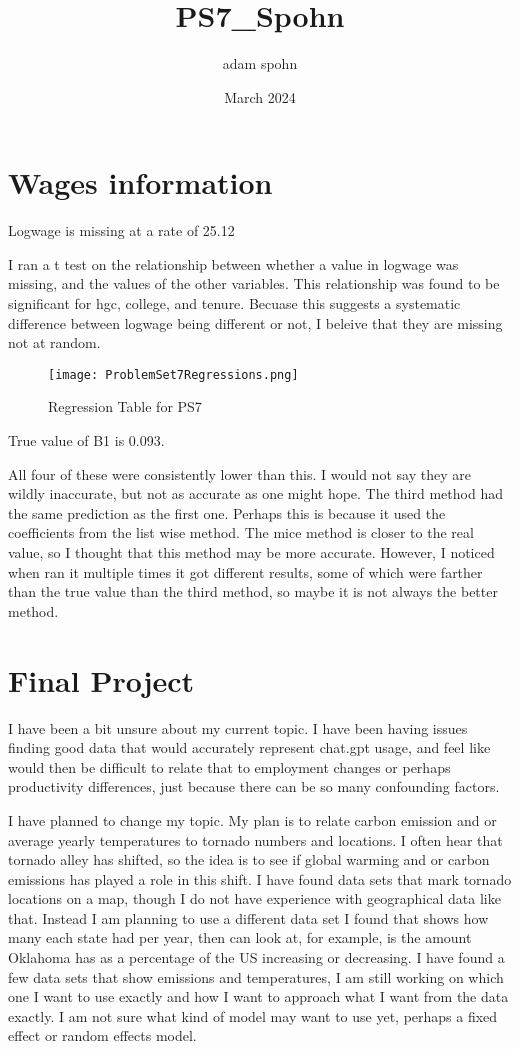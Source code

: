 \documentclass{article}
\title{PS7_Spohn}
\author{adam spohn}
\date{March 2024}
\begin{document}
\maketitle

\section{Wages information}

Logwage is missing at a rate of 25.12%

I ran a t test on the relationship between whether a value in logwage was missing, and the values of the other variables. This relationship was found to be significant for hgc, college, and tenure. Becuase this suggests a systematic difference between logwage being different or not, I beleive that they are missing not at random. 

\begin{figure}[htbp]
    \centering
    \texttt{[image: ProblemSet7Regressions.png]}
    \caption{Regression Table for PS7}
    \label{fig:problemset7}
\end{figure}

True value of B1 is 0.093.

All four of these were consistently lower than this. I would not say they are wildly inaccurate, but not as accurate as one might hope. The third method had the same prediction as the first one. Perhaps this is because it used the coefficients from the list wise method. The mice method is closer to the real value, so I thought that this method may be more accurate. However, I noticed when ran it multiple times it got different results, some of which were farther than the true value than the third method, so maybe it is not always the better method. 

\section{Final Project}

I have been a bit unsure about my current topic. I have been having issues finding good data that would accurately represent chat.gpt usage, and feel like would then be difficult to relate that to employment changes or perhaps productivity differences, just because there can be so many confounding factors.

I have planned to change my topic. My plan is to relate carbon emission and or average yearly temperatures to tornado numbers and locations. I often hear that tornado alley has shifted, so the idea is to see if global warming and or carbon emissions has played a role in this shift. I have found data sets that mark tornado locations on a map, though I do not have experience with geographical data like that. Instead I am planning to use a different data set I found that shows how many each state had per year, then can look at, for example, is the amount Oklahoma has as a percentage of the US increasing or decreasing. I have found a few data sets that show emissions and temperatures, I am still working on which one I want to use exactly and how I want to approach what I want from the data exactly. I am not sure what kind of model may want to use yet, perhaps a fixed effect or random effects model. 
\end{document}

